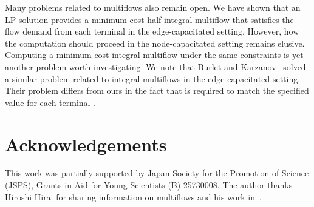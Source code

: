 \documentclass{article}
\begin{document}
Many problems related to multiflows also remain open. We have shown that 
an LP solution provides
a minimum cost half-integral
multiflow that satisfies the flow demand from each terminal
in the edge-capacitated setting. However, how the computation should proceed in 
the node-capacitated setting remains elusive.
Computing a minimum cost integral multiflow under the same constraints 
is yet another problem worth investigating. We note that
Burlet and Karzanov~\cite{BurletK98} solved a similar problem related to integral multiflows
in the edge-capacitated setting.
Their problem differs from ours in the fact that
 is required to 
match the specified value for each terminal .




\section*{Acknowledgements}
This work was partially supported by Japan Society for the Promotion of
Science (JSPS), Grants-in-Aid for Young Scientists (B) 25730008.
The author thanks Hiroshi Hirai for sharing information on multiflows
and his work in~\cite{Hirai14L-extendable}.
\end{document}

